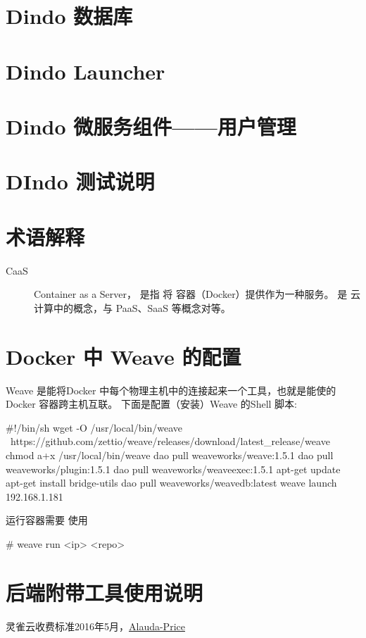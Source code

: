\documentclass{dingo}
\begin{document}
  \section{Dindo 数据库}

  \section{Dindo Launcher}

  \section{Dindo 微服务组件——用户管理}

  \section{DIndo 测试说明}

  \newpage
  \begin{appendix}
  	\section{术语解释}
  	\label{section:term}
		\begin{description}
			\item[CaaS] Container as a Server， 是指 将 容器（Docker）提供作为一种服务。
				是 云计算中的概念，与 PaaS、SaaS 等概念对等。
		\end{description}

  	\section{Docker 中 Weave  的配置} %
  	\label{section:dockerNweave}
  	Weave 是能将Docker 中每个物理主机中的连接起来一个工具，也就是能使的 Docker 容器跨主机互联。
  	下面是配置（安装）Weave 的Shell 脚本:
  	\begin{shell}[caption=Weave 安装]
#!/bin/sh
wget -O /usr/local/bin/weave \
https://github.com/zettio/weave/releases/download/latest_release/weave
chmod a+x /usr/local/bin/weave
dao pull weaveworks/weave:1.5.1
dao pull weaveworks/plugin:1.5.1
dao pull weaveworks/weaveexec:1.5.1
apt-get update
apt-get install bridge-utils
dao pull weaveworks/weavedb:latest
weave launch 192.168.1.181
  	\end{shell}
  	运行容器需要 使用
  	\begin{shell}
# weave run <ip> <repo>
  	\end{shell}

		\section{后端附带工具使用说明}

	  \begin{thebibliography}{}
		 	 灵雀云收费标准2016年5月，\href{http://www.alauda.cn/price/}{Alauda-Price}
		\end{thebibliography}
  \end{appendix}
\end{document}

